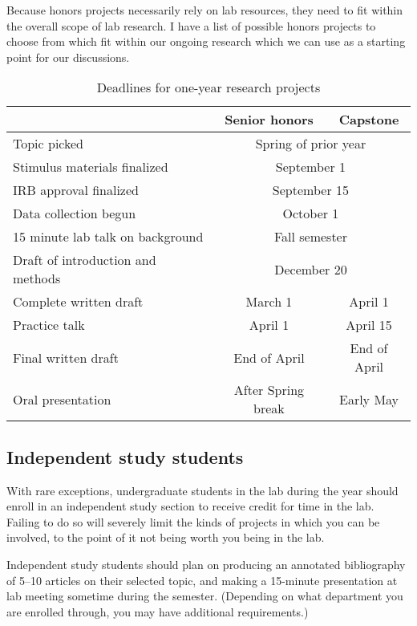 \documentclass[letterpaper,12pt,oneside]{memoir}
\begin{document}
Because honors projects necessarily rely on lab resources, they need to fit within the overall scope of lab research. I have a list of possible honors projects to choose from which fit within our ongoing research which we can use as a starting point for our discussions.



\begin{table}
\centering
\caption{Deadlines for one-year research projects}
\begin{tabular}{lcc}
\toprule
& Senior honors & Capstone\\
\midrule
Topic picked& \multicolumn{2}{c}{Spring of prior year}\\
Stimulus materials finalized& \multicolumn{2}{c}{September 1}\\
IRB approval finalized& \multicolumn{2}{c}{September 15}\\
Data collection begun& \multicolumn{2}{c}{October 1}\\
15 minute lab talk on background& \multicolumn{2}{c}{Fall semester}\\
Draft of introduction and methods& \multicolumn{2}{c}{December 20}\\
Complete written draft& March 1& April 1\\
Practice talk& April 1 & April 15\\
Final written draft& End of April & End of April\\
Oral presentation& After Spring break & Early May\\
\bottomrule
\end{tabular}
\end{table}

\subsection{Independent study students}
With rare exceptions, undergraduate students in the lab during the year should enroll in an independent study section to receive credit for time in the lab. Failing to do so will severely limit the kinds of projects in which you can be involved, to the point of it not being worth you being in the lab.

Independent study students should plan on producing an annotated bibliography of 5--10 articles on their selected topic, and making a 15-minute presentation at lab meeting sometime during the semester. (Depending on what department you are enrolled through, you may have additional requirements.)
\end{document}
